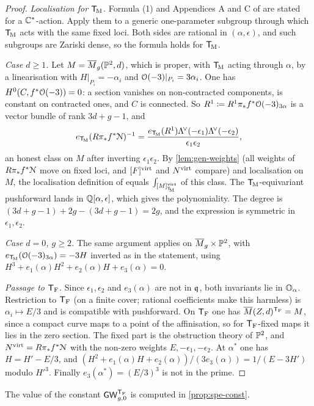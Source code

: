 \begin{proof}
\emph{Localisation for $\mathsf{T}_{\!\mathrm{M}}$.} Formula (1) and Appendices A and C of \cite{GP99} are stated for a $\mathbb{C}^*$-action. Apply them to a generic one-parameter subgroup through which $\mathsf{T}_{\!\mathrm{M}}$ acts with the same fixed loci. Both sides are rational in $(\alpha,\epsilon)$, and such subgroups are Zariski dense, so the formula holds for $\mathsf{T}_{\!\mathrm{M}}$.

\emph{Case $d\geq1$.} Let $M=\overline{M}_g(\mathbb{P}^2,d)$, which is proper, with $\mathsf{T}_{\!\mathrm{M}}$ acting through $\alpha$, by a linearisation with $H|_{P_i}=-\alpha_i$ and $\mathcal{O}(-3)|_{P_i}=3\alpha_i$. One has $H^0(C,f^*\mathcal{O}(-3))=0$: a section vanishes on non-contracted components, is constant on contracted ones, and $C$ is connected. So $R^1\coloneqq R^1\pi_*f^*\mathcal{O}(-3)_{3\alpha}$ is a vector bundle of rank $3d+g-1$, and
\[
e_{\mathsf{T}_{\!\mathrm{M}}}(R\pi_*f^*\mathcal{N})^{-1}=\frac{e_{\mathsf{T}_{\!\mathrm{M}}}(R^1)\Lambda^{\!\vee}(-\epsilon_1)\Lambda^{\!\vee}(-\epsilon_2)}{\epsilon_1\epsilon_2},
\]
an honest class on $M$ after inverting $\epsilon_1\epsilon_2$. By \cref{lem:gen-weights} (all weights of $R\pi_*f^*\mathcal{N}$ move on fixed loci, and $[F]^{\mathrm{virt}}$ and $N^{\mathrm{virt}}$ compare) and localisation on $M$, the localisation definition of \cite{BS} equals $\int_{[M]^{\mathrm{virt}}_{\mathsf{T}_{\!\mathrm{M}}}}$ of this class. The $\mathsf{T}_{\!\mathrm{M}}$-equivariant pushforward lands in $\mathbb{Q}[\alpha,\epsilon]$, which gives the polynomiality. The degree is $(3d+g-1)+2g-(3d+g-1)=2g$, and the expression is symmetric in $\epsilon_1,\epsilon_2$.

\emph{Case $d=0$, $g\geq2$.} The same argument applies on $\overline{M}_g\times\mathbb{P}^2$, with $e_{\mathsf{T}_{\!\mathrm{M}}}(\mathcal{O}(-3)_{3\alpha})=-3H$ inverted as in the statement, using $H^3+e_1(\alpha)H^2+e_2(\alpha)H+e_3(\alpha)=0$.

\emph{Passage to $\mathsf{T}_{\mathrm{F}}$.} Since $\epsilon_1,\epsilon_2$ and $e_3(\alpha)$ are not in $\mathfrak{q}$, both invariants lie in $\mathbb{O}_{\alpha}$. Restriction to $\mathsf{T}_{\mathrm{F}}$ (on a finite cover; rational coefficients make this harmless) is $\alpha_i\mapsto E/3$ and is compatible with pushforward. On $\mathsf{T}_{\mathrm{F}}$ one has $\overline{M}(Z,d)^{\mathsf{T}_{\mathrm{F}}}=M$, since a compact curve maps to a point of the affinisation, so for $\mathsf{T}_{\mathrm{F}}$-fixed maps it lies in the zero section. The fixed part is the obstruction theory of $\mathbb{P}^2$, and $N^{\mathrm{virt}}=R\pi_*f^*\mathcal{N}$ with the non-zero weights $E,-\epsilon_1,-\epsilon_2$. At $\alpha^*$ one has $H=H'-E/3$, and $(H^2+e_1(\alpha)H+e_2(\alpha))/(3e_3(\alpha))=1/(E-3H')$ modulo $H'^3$. Finally $e_3(\alpha^*)=(E/3)^3$ is not in the prime.
\end{proof}

The value of the constant $\mathsf{GW}_{g,0}^{\mathsf{T}_{\mathrm{F}}}$ is computed in \cref{prop:spe-const}.

